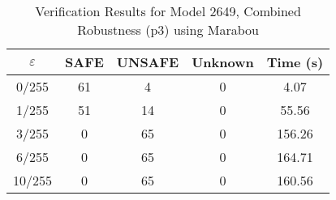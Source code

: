 \begin{table}[htbp]
\centering
\caption{Verification Results for Model 2649, Combined Robustness (p3) using Marabou}
\label{tab:model2649_p3_marabou}
\begin{tabular}{|c|c|c|c|c|}
\hline
$\varepsilon$ & SAFE & UNSAFE & Unknown & Time (s) \\ \hline
0/255 & 61 & 4 & 0 & 4.07 \\ \hline
1/255 & 51 & 14 & 0 & 55.56 \\ \hline
3/255 & 0 & 65 & 0 & 156.26 \\ \hline
6/255 & 0 & 65 & 0 & 164.71 \\ \hline
10/255 & 0 & 65 & 0 & 160.56 \\ \hline
\end{tabular}
\end{table}
